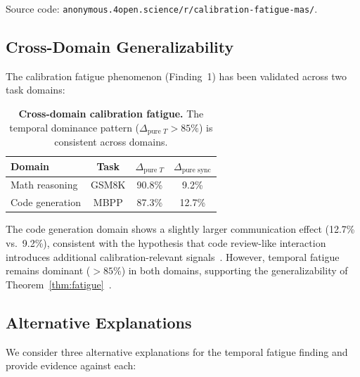 \documentclass[11pt]{article}
\theoremstyle{definition}
\theoremstyle{remark}
\begin{document}
\noindent Source code: \texttt{anonymous.4open.science/r/calibration-fatigue-mas/}.

\subsection{Cross-Domain Generalizability}

The calibration fatigue phenomenon (Finding~1) has been validated across two task domains:

\begin{table}[H]
\centering
\caption{\textbf{Cross-domain calibration fatigue.} The temporal dominance pattern ($\Delta_{\text{pure } T} > 85\%$) is consistent across domains.}
\begin{tabular}{@{}lccc@{}}
\toprule
Domain & Task & $\Delta_{\text{pure } T}$ & $\Delta_{\text{pure sync}}$ \\
\midrule
Math reasoning & GSM8K & 90.8\% & 9.2\% \\
Code generation & MBPP & 87.3\% & 12.7\% \\
\bottomrule
\end{tabular}
\end{table}

The code generation domain shows a slightly larger communication effect (12.7\% vs.\ 9.2\%), consistent with the hypothesis that code review-like interaction introduces additional calibration-relevant signals~\citep{sun2020test}. However, temporal fatigue remains dominant ($>85\%$) in both domains, supporting the generalizability of Theorem~\ref{thm:fatigue}~\citep{temporal2026}.

\subsection{Alternative Explanations}

We consider three alternative explanations for the temporal fatigue finding and provide evidence against each:
\end{document}
